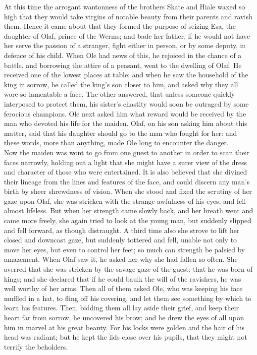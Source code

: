 \documentclass[10pt,a4paper]{report}
\begin{document}
At this time the arrogant wantonness of the brothers Skate and Hiale waxed so high that they would take virgins of notable beauty from their parents and ravish them. Hence it came about that they formed the purpose of seizing Esa, the daughter of Olaf, prince of the Werms; and bade her father, if he would not have her serve the passion of a stranger, fight either in person, or by some deputy, in defence of his child. When Ole had news of this, he rejoiced in the chance of a battle, and borrowing the attire of a peasant, went to the dwelling of Olaf. He received one of the lowest places at table; and when he saw the household of the king in sorrow, he called the king's son closer to him, and asked why they all wore so lamentable a face. The other answered, that unless someone quickly interposed to protect them, his sister's chastity would soon be outraged by some ferocious champions. Ole next asked him what reward would be received by the man who devoted his life for the maiden. Olaf, on his son asking him about this matter, said that his daughter should go to the man who fought for her: and these words, more than anything, made Ole long to encounter the danger.\\

Now the maiden was wont to go from one guest to another in order to scan their faces narrowly, holding out a light that she might have a surer view of the dress and character of those who were entertained. It is also believed that she divined their lineage from the lines and features of the face, and could discern any man's birth by sheer shrewdness of vision. When she stood and fixed the scrutiny of her gaze upon Olaf, she was stricken with the strange awfulness of his eyes, and fell almost lifeless. But when her strength came slowly back, and her breath went and came more freely, she again tried to look at the young man, but suddenly slipped and fell forward, as though distraught. A third time also she strove to lift her closed and downcast gaze, but suddenly tottered and fell, unable not only to move her eyes, but even to control her feet; so much can strength be palsied by amazement. When Olaf saw it, he asked her why she had fallen so often. She averred that she was stricken by the savage gaze of the guest; that he was born of kings; and she declared that if he could baulk the will of the ravishers, he was well worthy of her arms. Then all of them asked Ole, who was keeping his face muffled in a hat, to fling off his covering, and let them see something by which to learn his features. Then, bidding them all lay aside their grief, and keep their heart far from sorrow, he uncovered his brow; and he drew the eyes of all upon him in marvel at his great beauty. For his locks were golden and the hair of his head was radiant; but he kept the lids close over his pupils, that they might not terrify the beholders.\\
\end{document}
